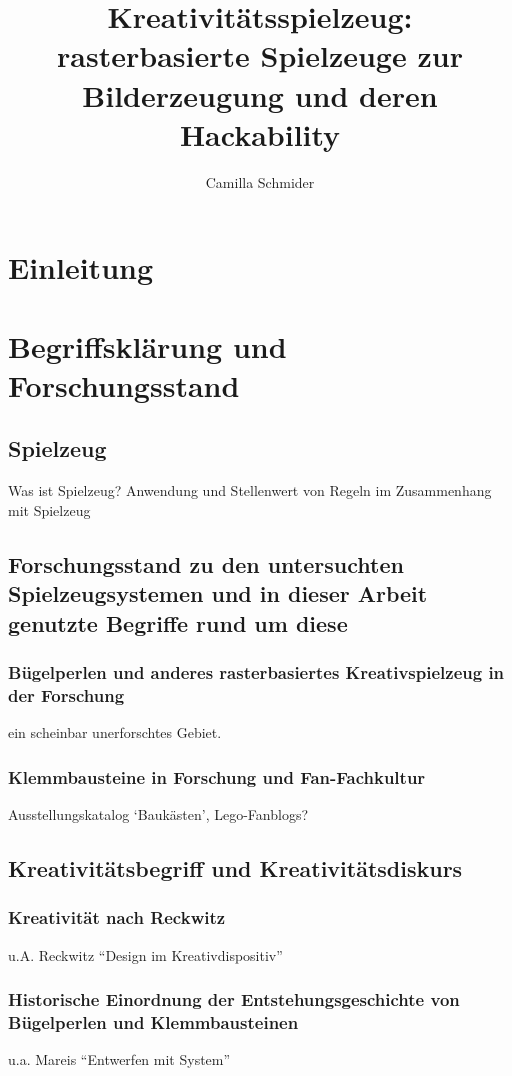 \documentclass[11pt,a4paper,twoside]{scrreprt}
\title{Kreativitätsspielzeug: rasterbasierte Spielzeuge zur Bilderzeugung und deren Hackability}
\author{Camilla Schmider}
\begin{document}
\maketitle
\tableofcontents

\chapter{Einleitung}


\chapter{Begriffsklärung und Forschungsstand}

	\section{Spielzeug}
	Was ist Spielzeug? Anwendung und Stellenwert von Regeln im Zusammenhang mit Spielzeug
	
	\section{Forschungsstand zu den untersuchten Spielzeugsystemen und in dieser Arbeit genutzte Begriffe rund um diese}
		\subsection{Bügelperlen und anderes rasterbasiertes Kreativspielzeug in der Forschung}
		ein scheinbar unerforschtes Gebiet.
		\subsection{Klemmbausteine in Forschung und Fan-Fachkultur}
		Ausstellungskatalog `Baukästen', Lego-Fanblogs?

	\section{Kreativitätsbegriff und Kreativitätsdiskurs}
		\subsection{Kreativität nach Reckwitz}
		u.A. Reckwitz ``Design im Kreativdispositiv''
		\subsection{Historische Einordnung der Entstehungsgeschichte von Bügelperlen und Klemmbausteinen}
		u.a. Mareis ``Entwerfen mit System''
\end{document}
